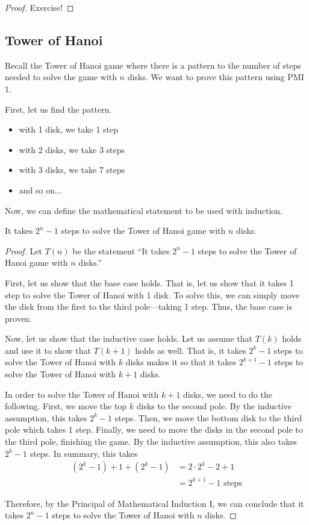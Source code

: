 \begin{proof}
    Exercise!
\end{proof}

\subsection{Tower of Hanoi}

Recall the Tower of Hanoi game where there is a pattern to the number of steps needed to solve the game with \(n\) disks. We want to prove this pattern using PMI 1.

First, let us find the pattern.
\begin{itemize}
    \item with 1 disk, we take 1 step
    \item with 2 disks, we take 3 steps
    \item with 3 disks, we take 7 steps
    \item and so on...
\end{itemize}

Now, we can define the mathematical statement to be used with induction.

\begin{claim}
    It takes \(2^n - 1\) steps to solve the Tower of Hanoi game with \(n\) disks.
\end{claim}

\begin{proof}
     Let \(T(n)\) be the statement ``It takes \(2^n - 1\) steps to solve the Tower of Hanoi game with \(n\) disks.''

    First, let us show that the base case holds. That is, let us show that it takes 1 step to solve the Tower of Hanoi with 1 disk. To solve this, we can simply move the disk from the first to the third pole---taking 1 step. Thus, the base case is proven.

    Now, let us show that the inductive case holds. Let us assume that \(T(k)\) holds and use it to show that \(T(k+1)\) holds as well. That is, it takes \(2^k-1\) steps to solve the Tower of Hanoi with \(k\) disks makes it so that it takes \(2^{k+1} - 1\) steps to solve the Tower of Hanoi with \(k+1\) disks.

    In order to solve the Tower of Hanoi with \(k+1\) disks, we need to do the following. First, we move the top \(k\) disks to the second pole. By the inductive assumption, this takes \(2^k - 1\) steps. Then, we move the bottom disk to the third pole which takes 1 step. Finally, we need to move the disks in the second pole to the third pole, finishing the game. By the inductive assumption, this also takes \(2^k - 1\) steps. In summary, this takes
    \[
    \begin{aligned}
        (2^k - 1) + 1 + (2^k - 1) &= 2 \cdot 2^k - 2 + 1 \\
                                  &= 2^{k+1} - 1 \text{ steps}
    \end{aligned}
    \]

    Therefore, by the Principal of Mathematical Induction I, we can conclude that it takes \(2^n - 1\) steps to solve the Tower of Hanoi with \(n\) disks.
\end{proof}


